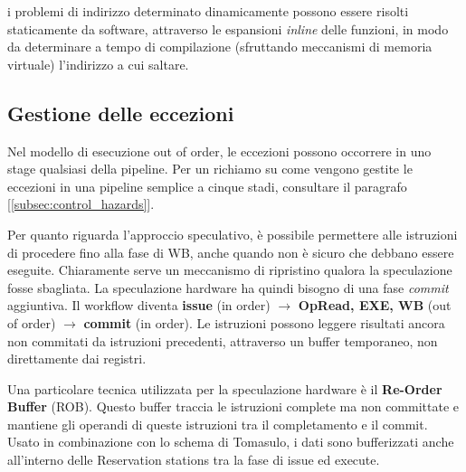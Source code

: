 \begin{info}
    i problemi di indirizzo determinato dinamicamente possono essere risolti staticamente da software, attraverso le espansioni \textit{inline} delle funzioni, in modo da determinare a tempo di compilazione (sfruttando meccanismi di memoria virtuale) l'indirizzo a cui saltare.  
\end{info}

\subsection{Gestione delle eccezioni}
Nel modello di esecuzione out of order, le eccezioni possono occorrere in uno stage qualsiasi della pipeline. Per un richiamo su come vengono gestite le eccezioni in una pipeline semplice a cinque stadi, consultare il paragrafo [\ref{subsec:control_hazards}].

\noindent Per quanto riguarda l'approccio speculativo, è possibile permettere alle istruzioni di procedere fino alla fase di WB, anche quando non è sicuro che debbano essere eseguite. Chiaramente serve un meccanismo di ripristino qualora la speculazione fosse sbagliata. La speculazione hardware ha quindi bisogno di una fase \textit{commit} aggiuntiva. 
Il workflow diventa \textbf{issue} (in order) $\rightarrow$ \textbf{OpRead, EXE, WB} (out of order) $\rightarrow$ \textbf{commit} (in order).
Le istruzioni possono leggere risultati ancora non commitati da istruzioni precedenti, attraverso un buffer temporaneo, non direttamente dai registri. 

\noindent Una particolare tecnica utilizzata per la speculazione hardware è il \textbf{Re-Order Buffer} (ROB). Questo buffer traccia le istruzioni complete ma non committate e mantiene gli operandi di queste istruzioni tra il completamento e il commit. Usato in combinazione con lo schema di Tomasulo, i dati sono bufferizzati anche all'interno delle Reservation stations tra la fase di issue ed execute. 

\begin{figure}[ht]
    \centering
    \setlength{\fboxrule}{0.5pt} %
    \setlength{\fboxsep}{0pt}    %
\end{figure}

